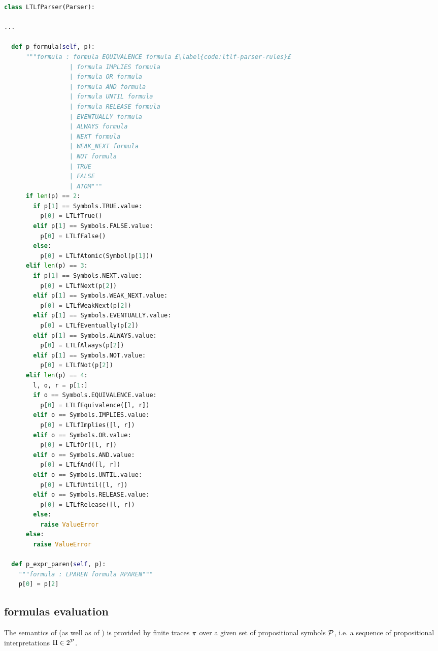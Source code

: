 \begin{lstlisting}[language=Python, style=Python, escapechar = £, label={code:ltlf-parser}, caption={An extract from \href{https://github.com/MarcoFavorito/flloat/blob/0.1.4/flloat/parser/ltlf.py}{flloat/parser/ltlf.py}.}]
class LTLfParser(Parser):

...

  def p_formula(self, p):
      """formula : formula EQUIVALENCE formula £\label{code:ltlf-parser-rules}£
                  | formula IMPLIES formula
                  | formula OR formula
                  | formula AND formula
                  | formula UNTIL formula
                  | formula RELEASE formula
                  | EVENTUALLY formula
                  | ALWAYS formula
                  | NEXT formula
                  | WEAK_NEXT formula
                  | NOT formula
                  | TRUE
                  | FALSE
                  | ATOM"""
      if len(p) == 2:
        if p[1] == Symbols.TRUE.value:
          p[0] = LTLfTrue()
        elif p[1] == Symbols.FALSE.value:
          p[0] = LTLfFalse()
        else:
          p[0] = LTLfAtomic(Symbol(p[1]))
      elif len(p) == 3:
        if p[1] == Symbols.NEXT.value:
          p[0] = LTLfNext(p[2])
        elif p[1] == Symbols.WEAK_NEXT.value:
          p[0] = LTLfWeakNext(p[2])
        elif p[1] == Symbols.EVENTUALLY.value:
          p[0] = LTLfEventually(p[2])
        elif p[1] == Symbols.ALWAYS.value:
          p[0] = LTLfAlways(p[2])
        elif p[1] == Symbols.NOT.value:
          p[0] = LTLfNot(p[2])
      elif len(p) == 4:
        l, o, r = p[1:]
        if o == Symbols.EQUIVALENCE.value:
          p[0] = LTLfEquivalence([l, r])
        elif o == Symbols.IMPLIES.value:
          p[0] = LTLfImplies([l, r])
        elif o == Symbols.OR.value:
          p[0] = LTLfOr([l, r])
        elif o == Symbols.AND.value:
          p[0] = LTLfAnd([l, r])
        elif o == Symbols.UNTIL.value:
          p[0] = LTLfUntil([l, r])
        elif o == Symbols.RELEASE.value:
          p[0] = LTLfRelease([l, r])
        else:
          raise ValueError
      else:
        raise ValueError

  def p_expr_paren(self, p):
    """formula : LPAREN formula RPAREN"""
    p[0] = p[2]
\end{lstlisting}

\subsection{\LTLf formulas evaluation}\label{sect:flloat-ltlf-semantics}
The semantics of \LTLf (as well as of \LDLf) is provided by finite traces $\pi$ over a given set of propositional symbols $\mathcal{P}$, i.e. a sequence of propositional interpretations $\Pi\in 2^{\mathcal{P}}$.

